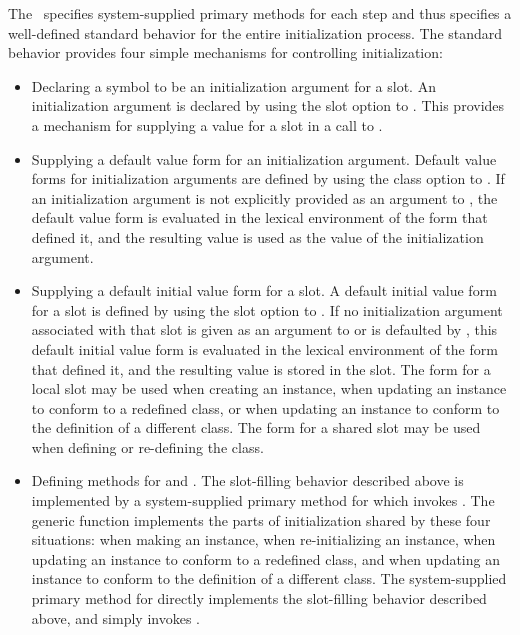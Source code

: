 The \OS\ specifies system-supplied primary methods for each step and
thus specifies a well-defined standard behavior for the entire
initialization process.  The standard behavior provides four simple
mechanisms for controlling initialization:

\begin{itemize}

\item  Declaring a symbol to be an initialization argument for a
slot.  An initialization argument is declared by using the 
 slot option to .  This provides a mechanism
for supplying a value for a slot in a call to .

\item  Supplying a default value form for an initialization
argument.  Default value forms for initialization arguments are
defined by using the  class option to 
.  If an initialization argument is not explicitly provided
as an argument to , the default value form is
evaluated in the lexical environment of the  form that
defined it, and the resulting value is used as the value of the
initialization argument.

\item  Supplying a default initial value form for a slot.  A
default initial value form for a slot is defined by using the 
 slot option to .  If no initialization
argument associated with that slot is given as an argument to 
 or is defaulted by , this
default initial value form is evaluated in the lexical environment of
the  form that defined it, and the resulting value is
stored in the slot.  The  form for a local slot may be
used when creating an instance, when updating an instance to conform
to a redefined class, or when updating an instance to conform to the
definition of a different class. The  form for a shared
slot may be used when defining or re-defining the class.

\item  Defining methods for  and 
.  The slot-filling behavior described above is
implemented by a system-supplied primary method for 
 which invokes . The
generic function  implements the parts of
initialization shared by these four situations: when making an
instance, when re-initializing an instance, when updating an instance
to conform to a redefined class, and when updating an instance to
conform to the definition of a different class. The system-supplied
primary method for  directly implements the
slot-filling behavior described above, and 
simply invokes .

\end{itemize}

